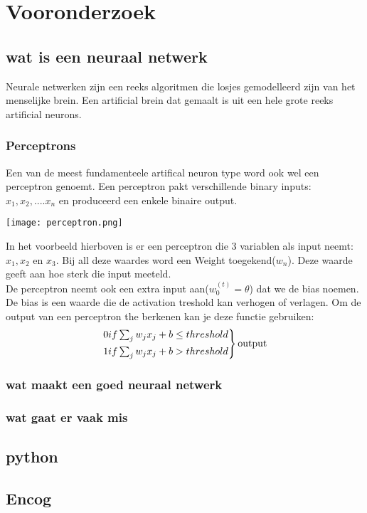 \section{Vooronderzoek}

\subsection{wat is een neuraal netwerk}
Neurale netwerken zijn een reeks algoritmen die losjes gemodelleerd zijn van het menselijke brein. Een artificial brein dat gemaalt is uit een hele grote reeks artificial neurons.

\subsubsection{Perceptrons}
Een van de meest fundamenteele artifical neuron type word ook wel een perceptron genoemt. Een perceptron pakt verschillende binary inputs:\\ $x_{1}, x_{2},....x_{n}$ en produceerd een enkele binaire output.
\begin{center}
\texttt{[image: perceptron.png]}
\end{center}
In het voorbeeld hierboven is er een perceptron die 3 variablen als input neemt: $x_{1}, x_{2}$ en $x_{3}.$ Bij all deze waardes word een Weight toegekend($w_{n}$). Deze waarde geeft aan hoe sterk die input meeteld.\\
De perceptron neemt ook een extra input aan($w_{0}^{(t)}=\theta $) dat we de bias noemen. De bias is een waarde die de activation treshold kan verhogen of verlagen. Om de output van een perceptron the berkenen kan je deze functie gebruiken:
\begin{equation*}
\begin{rcases}
        0  if \sum_{j}w_{j}x_{j}+b \leq threshold \\
        1  if \sum_{j}w_{j}x_{j}+b > threshold
\end{rcases} 
\text{output}
\end{equation*}

\subsubsection{wat maakt een goed neuraal netwerk}

\subsubsection{wat gaat er vaak mis}

\subsection{python}

\subsection{Encog}
